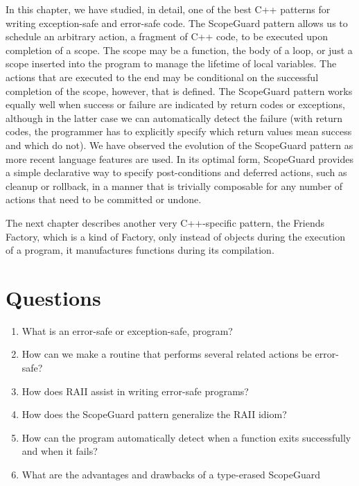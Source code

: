 In this chapter, we have studied, in detail, one of the best C++ patterns for writing exception-safe and error-safe code. The ScopeGuard pattern allows us to schedule an arbitrary action, a fragment of C++ code, to be executed upon completion of a scope. The scope may be a function, the body of a loop, or just a scope inserted into the program to manage the lifetime of local variables. The actions that are executed to the end may be conditional on the successful completion of the scope, however, that is defined. The ScopeGuard pattern works equally well when success or failure are indicated by return codes or exceptions, although in the latter case we can automatically detect the failure (with return codes, the programmer has to explicitly specify which return values mean success and which do not). We have observed the evolution of the ScopeGuard pattern as more recent language features are used. In its optimal form, ScopeGuard provides a simple declarative way to specify post-conditions and deferred actions, such as cleanup or rollback, in a manner that is trivially composable for any number of actions that need to be committed or undone.

The next chapter describes another very C++-specific pattern, the Friends Factory, which is a kind of Factory, only instead of objects during the execution of a program, it manufactures functions during its compilation.

\section{Questions}

\begin{enumerate}
\item
  What is an error-safe or exception-safe, program?
\item
  How can we make a routine that performs several related actions be error-safe?
\item
  How does RAII assist in writing error-safe programs?
\item
  How does the ScopeGuard pattern generalize the RAII idiom?
\item
  How can the program automatically detect when a function exits successfully and when it fails?
\item
  What are the advantages and drawbacks of a type-erased ScopeGuard
\end{enumerate}

